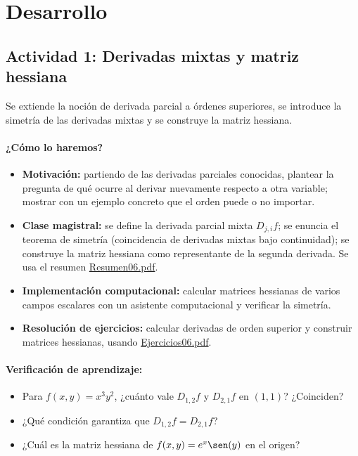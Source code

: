 \documentclass[a4,11pt]{aleph-notas}
\begin{document}
\section*{Desarrollo}

\subsection*{Actividad 1: Derivadas mixtas y matriz hessiana}
Se extiende la noción de derivada parcial a órdenes superiores, se introduce la simetría de las derivadas mixtas y se construye la matriz hessiana.

\paragraph{¿Cómo lo haremos?}
\begin{itemize}[leftmargin=*]
    \item \textbf{Motivación:} partiendo de las derivadas parciales conocidas, plantear la pregunta de qué ocurre al derivar nuevamente respecto a otra variable; mostrar con un ejemplo concreto que el orden puede o no importar.
    \item \textbf{Clase magistral:} se define la derivada parcial mixta $D_{j,i}f$; se enuncia el teorema de simetría (coincidencia de derivadas mixtas bajo continuidad); se construye la matriz hessiana como representante de la segunda derivada. Se usa el resumen \href{https://andres-merino.github.io/MatematicaIII-05-N0051/01Resumen/Resumen06.pdf}{Resumen06.pdf}.
    \item \textbf{Implementación computacional:} calcular matrices hessianas de varios campos escalares con un asistente computacional y verificar la simetría.
    \item \textbf{Resolución de ejercicios:} calcular derivadas de orden superior y construir matrices hessianas, usando \href{https://andres-merino.github.io/MatematicaIII-05-N0051/04Ejercicios/Ejercicios06.pdf}{Ejercicios06.pdf}.
\end{itemize}

\paragraph{Verificación de aprendizaje:}
\begin{itemize}[leftmargin=*]
    \item Para $f(x,y)=x^3y^2$, ¿cuánto vale $D_{1,2}f$ y $D_{2,1}f$ en $(1,1)$? ¿Coinciden?
    \item ¿Qué condición garantiza que $D_{1,2}f = D_{2,1}f$?
    \item ¿Cuál es la matriz hessiana de $f(x,y)=e^x\sen(y)$ en el origen?
\end{itemize}
\end{document}
